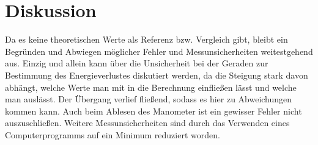 \section{Diskussion}
\label{sec:Diskussion}
Da es keine theoretischen Werte als Referenz bzw. Vergleich gibt, bleibt ein Begründen und Abwiegen möglicher Fehler und 
Messunsicherheiten weitestgehend aus.
Einzig und allein kann über die Unsicherheit bei der Geraden zur Bestimmung des Energieverlustes diskutiert werden,
da die Steigung stark davon abhängt, welche Werte man mit in die Berechnung einfließen lässt und welche man auslässt.
Der Übergang verlief fließend, sodass es hier zu Abweichungen kommen kann.
Auch beim Ablesen des Manometer ist ein gewisser Fehler nicht auszuschließen. Weitere Messunsicherheiten sind durch das Verwenden eines 
Computerprogramms auf ein Minimum reduziert worden.